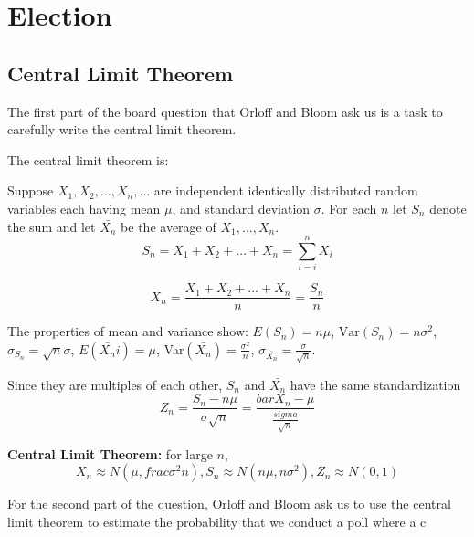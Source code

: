 \documentclass[a4paper,11pt]{article}
\begin{document}
\section{Election}
\subsection{Central Limit Theorem}
The first part of the board question that Orloff and Bloom ask
us is a task to carefully write the central limit theorem.

The central limit theorem is:

Suppose $X_1, X_2, \ldots, X_n, \ldots$ are independent identically distributed
random variables each having mean $\mu$, and standard deviation $\sigma$. For
each $n$ let $S_n$ denote the sum and let $\bar{X_n}$ be the average of
$X_1, \ldots, X_n$.
\begin{equation}
  S_n = X_1 + X_2 + \ldots + X_n = \sum_{i=i}^n X_i
\end{equation}

\begin{equation}
  \bar{X_n} = \frac{X_1 + X_2 + \ldots + X_n}{n} = \frac{S_n}{n}
\end{equation}

The properties of mean and variance show: $E\left(S_n\right)=n\mu$,
$\text{Var}\left( S_n \right)=n\sigma^2$, $\sigma_{S_n}=\sqrt{n}\sigma$,
$E\left(\bar{X_n}i\right) = \mu$, Var$\left(\bar{X_n}\right)=\frac{\sigma^2}{n}$,
$\sigma_{\bar{X_n}} = \frac{\sigma}{\sqrt{n}}$.

Since they are multiples of each other, $S_n$ and $\bar{X_n}$ have the same
standardization
\begin{equation}
  Z_n = \frac{S_n- n\mu}{\sigma\sqrt{n}}
  = \frac{bar{X_n - \mu}}{\frac{sigma}{\sqrt{n}}}
\end{equation}

\textbf{Central Limit Theorem:} for large $n$,
\begin{equation}
X_n \approx  N\left( \mu, frac{\sigma^2}{n} \right), S_n \approx N\left(n\mu, n\sigma^2 \right), 
  Z_n \approx N \left(0, 1\right)
\end{equation}

For the second part of the question, Orloff and Bloom ask us to
use the central limit theorem to estimate the probability
that we conduct a poll where a c

\printbibliography{}
\end{document}
